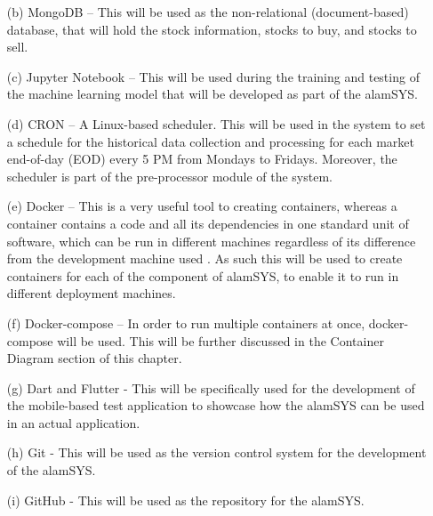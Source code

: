 \begin{itemize}
\begin{itemize}
            \item[(b)] MongoDB – This will be used as the non-relational (document-based) database, 
            that will hold the stock information, stocks to buy, and stocks to sell.
            \item[(c)] Jupyter Notebook – This will be used during the training and testing of 
            the machine learning model that will be developed as part of the alamSYS.
            \item[(d)] CRON – A Linux-based scheduler. This will be used in the system to set a 
            schedule for the historical data collection and processing for each market end-of-day 
            (EOD) every 5 PM from Mondays to Fridays. Moreover, the scheduler is part of the 
            pre-processor module of the system.
            \item[(e)] Docker – This is a very useful tool to creating containers, 
            whereas a container contains a code and all its dependencies in one standard unit of software, 
            which can be run in different machines regardless of its difference from the development machine 
            used \cite{Docker}.
            As such this will be used to create containers for each of the component of alamSYS, 
            to enable it to run in different deployment machines.
            \item[(f)] Docker-compose – In order to run multiple containers at once, 
            docker-compose will be used. This will be further discussed in the Container Diagram 
            section of this chapter.
            \item[(g)] Dart and Flutter - This will be specifically used for the development of the mobile-based 
            test application to showcase how the alamSYS can be used in an actual application.
            \item[(h)] Git - This will be used as the version control system for the development of the alamSYS.
            \item[(i)] GitHub - This will be used as the repository for the alamSYS.
        \end{itemize}
\end{itemize}